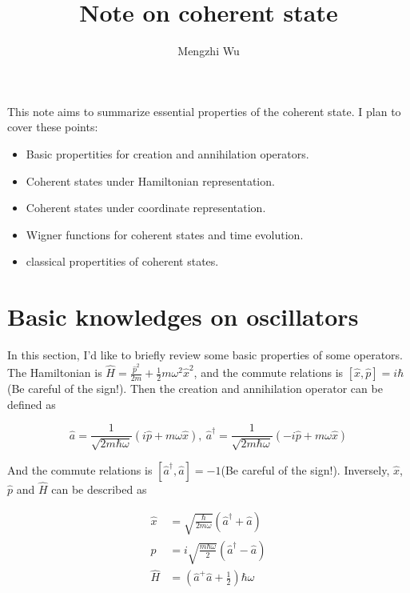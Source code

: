 \documentclass{article}
\title{Note on coherent state}
\author{Mengzhi Wu}
\begin{document}
    \maketitle

    This note aims to summarize essential properties of the coherent state. I plan to cover these points:

    \begin{itemize}
        \item Basic propertities for creation and annihilation operators.
        \item Coherent states under Hamiltonian representation.
        \item Coherent states under coordinate representation.
        \item Wigner functions for coherent states and time evolution.
        \item classical propertities of coherent states.
    \end{itemize}

    \section{Basic knowledges on oscillators}
        In this section, I'd like to briefly review some basic properties of some operators. The Hamiltonian is $\hat{H}=\frac{\hat{p}^2}{2m}+\frac{1}{2}m\omega^2\hat{x}^2$, and the commute relations is $[\hat{x},\hat{p}]=i\hbar$(Be careful of the sign!). Then the creation and annihilation operator can be defined as 

        \begin{equation}
            \hat{a}= \frac{1}{\sqrt{2m\hbar\omega}}(i\hat{p}+m\omega\hat{x}), \ \hat{a}^\dagger=\frac{1}{\sqrt{2m\hbar\omega}}(-i\hat{p}+m\omega\hat{x})
        \end{equation}

        And the commute relations is $[\hat{a}^\dagger, \hat{a}]=-1$(Be careful of the sign!). Inversely, $\hat{x}$, $\hat{p}$ and $\hat{H}$ can be described as 

        \begin{equation}
            \begin{split}
                \hat{x}&= \sqrt{\frac{\hbar}{2m\omega}}(\hat{a}^\dagger+\hat{a}) \\
                \hat{p}&= i\sqrt{\frac{m\hbar\omega}{2}}(\hat{a}^\dagger-\hat{a}) \\
                \hat{H}&= (\hat{a}^+\hat{a}+\frac{1}{2})\hbar\omega
            \end{split}
        \end{equation}
\end{document}
